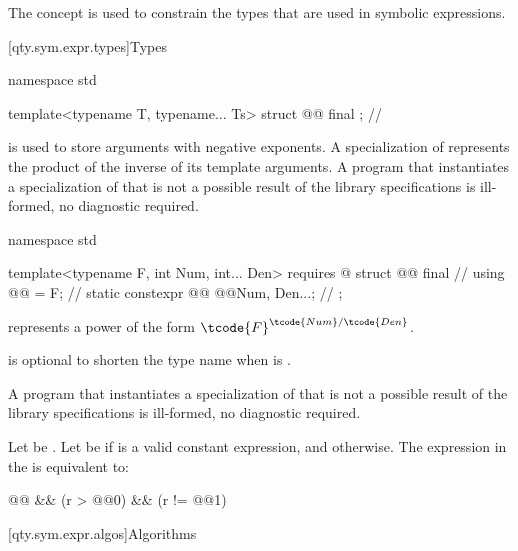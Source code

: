 \pnum
The concept 
is used to constrain the types
that are used in symbolic expressions.

[qty.sym.expr.types]{Types}

\begin{codeblock}
namespace std {

template<typename T, typename... Ts>
struct @@ final {};  // \expos

}
\end{codeblock}

\pnum
{} is used to store arguments with negative exponents.
A specialization of 
represents the product of the inverse of its template arguments.
A program that instantiates a specialization of 
that is not a possible result of the library specifications
is ill-formed, no diagnostic required.

\begin{codeblock}
namespace std {

template<typename F, int Num, int... Den>
  requires @\seebelownc@
struct @@ final {  // \expos
  using @@ = F;                              // \expos
  static constexpr @@ @@{Num, Den...};  // \expos
};

}
\end{codeblock}

\pnum
{} represents a power
of the form $\tcode{F}^{\tcode{Num}/\tcode{Den}}$.
\begin{note}
 is optional to shorten the type name when  is .
\end{note}
A program that instantiates a specialization of 
that is not a possible result of the library specifications
is ill-formed, no diagnostic required.

\pnum
Let  be .
Let  be
 if  is a valid constant expression, and
 otherwise.
The expression in the  is equivalent to:
\begin{codeblock}
@@ && (r > @@{0}) && (r != @@{1})
\end{codeblock}

[qty.sym.expr.algos]{Algorithms}

